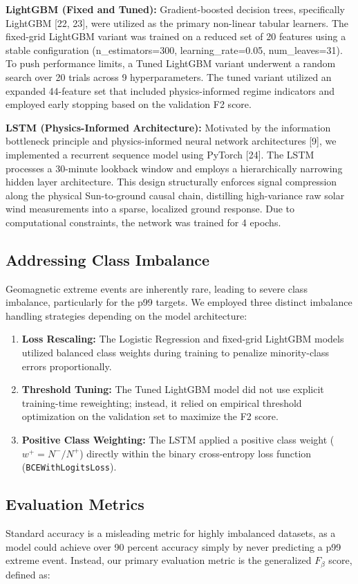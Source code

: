\documentclass[conference]{IEEEtran}
\begin{document}
\textbf{LightGBM (Fixed and Tuned):} Gradient-boosted decision trees, specifically LightGBM [22, 23], were utilized as the primary non-linear tabular learners. The fixed-grid LightGBM variant was trained on a reduced set of 20 features using a stable configuration (n\_estimators=300, learning\_rate=0.05, num\_leaves=31). To push performance limits, a Tuned LightGBM variant underwent a random search over 20 trials across 9 hyperparameters. The tuned variant utilized an expanded 44-feature set that included physics-informed regime indicators and employed early stopping based on the validation F2 score.

\textbf{LSTM (Physics-Informed Architecture):} Motivated by the information bottleneck principle and physics-informed neural network architectures [9], we implemented a recurrent sequence model using PyTorch [24]. The LSTM processes a 30-minute lookback window and employs a hierarchically narrowing hidden layer architecture. This design structurally enforces signal compression along the physical Sun-to-ground causal chain, distilling high-variance raw solar wind measurements into a sparse, localized ground response. Due to computational constraints, the network was trained for 4 epochs.

\subsection{Addressing Class Imbalance}
Geomagnetic extreme events are inherently rare, leading to severe class imbalance, particularly for the p99 targets. We employed three distinct imbalance handling strategies depending on the model architecture:
\begin{enumerate}
    \item \textbf{Loss Rescaling:} The Logistic Regression and fixed-grid LightGBM models utilized balanced class weights during training to penalize minority-class errors proportionally.
    \item \textbf{Threshold Tuning:} The Tuned LightGBM model did not use explicit training-time reweighting; instead, it relied on empirical threshold optimization on the validation set to maximize the F2 score.
    \item \textbf{Positive Class Weighting:} The LSTM applied a positive class weight ($w^+ = N^- / N^+$) directly within the binary cross-entropy loss function (\texttt{BCEWithLogitsLoss}).
\end{enumerate}

\subsection{Evaluation Metrics}
Standard accuracy is a misleading metric for highly imbalanced datasets, as a model could achieve over 90 percent accuracy simply by never predicting a p99 extreme event. Instead, our primary evaluation metric is the generalized $F_\beta$ score, defined as:
\end{document}
